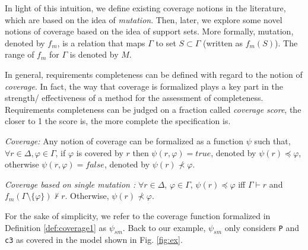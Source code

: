 

\iffalse
In light of this intuition, we define existing coverage notions in the literature, which are based on the idea of \emph{mutation}. Then, later, we explore some novel notions of coverage based on the idea of support sets.  More formally, mutation, denoted by $f_m$, is a relation that maps $\Gamma$ to set $S \subset \Gamma$ (written as $f_m (S)$). The range of $f_m$ for $\Gamma$ is denoted by $M$.

In general, requirements completeness can be defined with regard to the notion of \emph{coverage}. In fact, the way that coverage is formalized plays a key part in the strength/ effectiveness of a method for the assessment of completeness. Requirements completeness can be judged on a fraction called \emph{coverage score}, the closer to 1 the score is, the more complete the specification is.

\begin{definition}{\emph{Coverage:}}
  \label{def:coverage}
   Any notion of coverage can be formalized as a function $\psi$ such that,
   $\forall r \in \Delta, \varphi \in \Gamma$, if $\varphi$ is covered by $r$ then $\psi (r, \varphi) = true$, denoted by $\psi (r) \preccurlyeq \varphi$, otherwise  $\psi (r, \varphi) = false$, denoted by $\psi (r) \nprec \varphi$.
\end{definition}

\begin{definition} {\emph{Coverage based on single mutation \cite{chockler2010coverage, chockler_coverage_2003}:}}
  \label{def:coverage1}
   $\forall r \in \Delta$,
   $\varphi \in \Gamma$,
   $\psi (r) \preccurlyeq \varphi$
   iff $\Gamma \vdash r$ and
   $f_m (\Gamma \setminus \{ \varphi \}) \nvdash r$. Otherwise, $\psi (r) \nprec \varphi$.
\end{definition}

For the sake of simplicity, we refer to the coverage function
formalized in Definition \ref{def:coverage1} as $\psi_{sm}$.
Back to our example, $\psi_{sm}$ only considers {\tt P} and {\tt c3} as covered in the model shown in Fig. \ref{fig:ex}.

